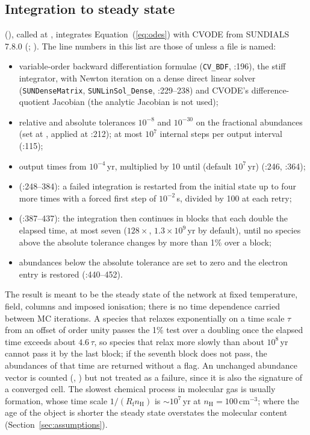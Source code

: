 \subsection{Integration to steady state}

 (), called at
, integrates Equation~(\ref{eq:odes}) with CVODE from
SUNDIALS 7.8.0 (; \citealt{Hindmarsh2005,Gardner2022}). The line numbers
in this list are those of  unless a file is
named:
\begin{itemize}
\item variable-order backward differentiation formulae (\verb|CV_BDF|, :196),
  the stiff integrator, with Newton iteration on a dense direct linear solver
  (\verb|SUNDenseMatrix|, \verb|SUNLinSol_Dense|, :229--238) and CVODE's
  difference-quotient Jacobian (the analytic Jacobian is not used);
\item relative and absolute tolerances $10^{-8}$ and $10^{-30}$ on the fractional
  abundances (set at , applied at :212); at most
  $10^7$ internal steps per output interval (:115);
\item output times from $10^{-4}$\,yr, multiplied by 10 until
   (default $10^7$\,yr) (:246, :364);
\item {} (:248--384): a failed integration is restarted from the
  initial state up to four more times with a forced first step of
  $10^{-2}$\,s, divided by 100 at each retry;
\item {} (:387--437): the integration then continues in blocks that
  each double the elapsed time, at most seven ($128\times$,
  $1.3\times10^9$\,yr by default), until no species above the absolute tolerance
  changes by more than 1\% over a block;
\item abundances below the absolute tolerance are set to zero and the
  electron entry is restored (:440--452).
\end{itemize}
The result is meant to be the steady state of the network at fixed
temperature, field, columns and imposed ionisation; there is no time
dependence carried between MC iterations. A species that relaxes
exponentially on a time scale $\tau$ from an offset of order unity passes the 1\%
test over a doubling once the elapsed time exceeds about $4.6\,\tau$, so species
that relax more slowly than about $10^8$\,yr cannot pass it by the last block;
if the seventh block does not pass, the abundances of that time are returned
without a flag. An
unchanged abundance vector is counted (,
) but not treated as a failure, since it is also the
signature of a converged cell. The slowest chemical process in molecular gas
is usually \Htwo{} formation, whose time scale $1/(R_{\mathrm f}n_{\mathrm H})$ is
$\sim10^7$\,yr at $n_{\mathrm H}=100$\,cm$^{-3}$; where the age of the object is shorter
the steady state overstates the molecular content
(Section~\ref{sec:assumptions}).

